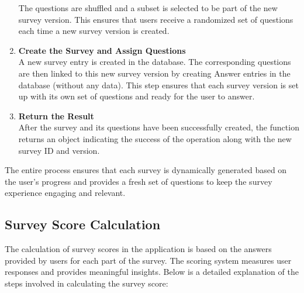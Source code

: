 \begin{enumerate}
    The questions are shuffled and a subset is selected to be part of the new survey version. This ensures that users receive a randomized set of questions each time a new survey version is created.
    \item \textbf{Create the Survey and Assign Questions} \\
    A new survey entry is created in the database. The corresponding questions are then linked to this new survey version by creating Answer entries in the database (without any data). This step ensures that each survey version is set up with its own set of questions and ready for the user to answer.
    \item \textbf{Return the Result} \\
    After the survey and its questions have been successfully created, the function returns an object indicating the success of the operation along with the new survey ID and version.
\end{enumerate}

\noindent The entire process ensures that each survey is dynamically generated based on the user's progress and provides a fresh set of questions to keep the survey experience engaging and relevant.

\subsection{Survey Score Calculation}

The calculation of survey scores in the application is based on the answers provided by users for each part of the survey. The scoring system measures user responses and provides meaningful insights. Below is a detailed explanation of the steps involved in calculating the survey score:

